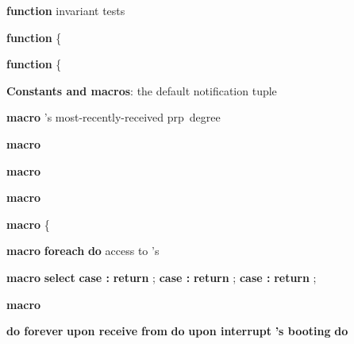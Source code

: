 \documentclass[11pt]{article}
\newcommand{\noReconfig}{noReco}
\newcommand{\notif}{prp}
\begin{document}
\begin{algorithm*}[t!]
\begin{footnotesize}
{\bf function} \label{ln:\noReconfig}  \hfill invariant tests 






{\bf function}  \label{ln:configEstab}   \{\lIf{}{ } 





 
{\bf function}  \label{ln:participate}   \{\lIf{}{ }  


\vspace{0.35em}

{\bf Constants and macros}:  \label{ln:dfltNtf} \hfill {the default notification tuple} 






{\bf macro}   {} \hfill {'s most-recently-received \notif ~degree} \label{ln:degree}



{\bf macro} \label{ln:eachoNoAll}   \Return{ }  

{\bf macro} \label{ln:echoDef}   \Return{ } 

{\bf macro} \label{ln:sameK}   \Return{ }  


{\bf macro} \label{ln:maxNotif}
  \{




 
{\bf macro} \label{ln:confSetVal}  {\bf foreach} {} {\bf do} { \hfill {access to 's }   }

{\bf macro} \label{ln:incrementphs}  {\bf select} {\bf case :}  {\bf return} ; {\bf case :}  {\bf return} ;   {\bf case :}  {\bf return} ; 



{\bf macro} \label{ln:allSaw} \;

\vspace{0.35em}

{\bf do forever} \label{ln:doForever} 
{\bf upon receive}  {\bf from}  {\bf do} 
 \label{ln:receive}\;
{\bf upon interrupt} {\bf 's booting} {\bf do} 
\lForEach{}{\label{ln:join}}
\end{footnotesize}
\end{algorithm*}
\end{document}
